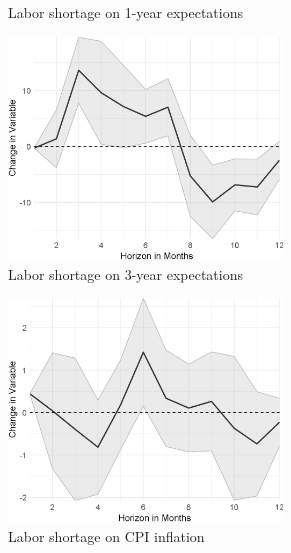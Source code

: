 \begin{figure}
\begin{subfigure}{00.24\textwidth}
		\caption{Labor shortage on 1-year expectations}
	\end{subfigure}
	\begin{subfigure}{00.24\textwidth}
		\includegraphics[width=0.8\textwidth]{output/lp/baseline/bHP/labor_shortage/labor_shortageonexpectations3y_djn.eps}
		\caption{Labor shortage on 3-year expectations}
	\end{subfigure}
	\begin{subfigure}{00.24\textwidth}
		\includegraphics[width=0.8\textwidth]{output/lp/baseline/bHP/labor_shortage/labor_shortageoninflation_djn.eps}
		\caption{Labor shortage on CPI inflation}
	\end{subfigure}
	\begin{subfigure}{00.24\textwidth}

\end{subfigure}
\end{figure}
